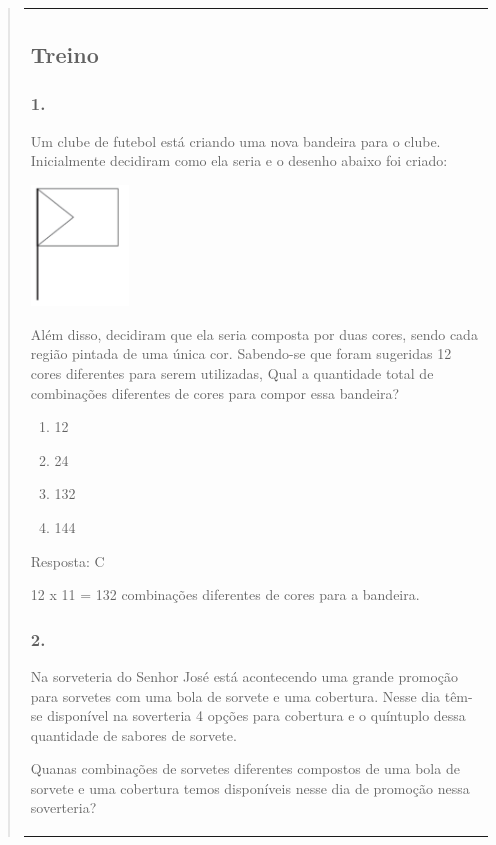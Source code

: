 \begin{enumerate}
\begin{escolha}
\begin{enumerate}
\begin{itemize}
\begin{itemize}
\begin{escolha}
\begin{quote}
\begin{escolha}
{\begin{longtable}[]{@{}l@{}}
\begin{itemize}
\subsection{Treino}\label{treino-10}

\subsubsection{1.}\label{section-140}

Um clube de futebol está criando uma nova bandeira para o clube.
Inicialmente decidiram como ela seria e o desenho abaixo foi criado:

\includegraphics[width=1.02511in,height=1.26282in]{media/image140.png}

Além disso, decidiram que ela seria composta por duas cores, sendo cada
região pintada de uma única cor. Sabendo-se que foram sugeridas 12 cores
diferentes para serem utilizadas, Qual a quantidade total de combinações
diferentes de cores para compor essa bandeira?

\begin{enumerate}
\def\labelenumi{\alph{enumi})}
\item
  12
\item
  24
\item
  132
\item
  144
\end{enumerate}

Resposta: C

12 x 11 = 132 combinações diferentes de cores para a bandeira.

\subsubsection{2.}\label{section-141}

Na sorveteria do Senhor José está acontecendo uma grande promoção para
sorvetes com uma bola de sorvete e uma cobertura. Nesse dia têm-se
disponível na soverteria 4 opções para cobertura e o quíntuplo dessa
quantidade de sabores de sorvete.

Quanas combinações de sorvetes diferentes compostos de uma bola de
sorvete e uma cobertura temos disponíveis nesse dia de promoção nessa
soverteria?


\end{itemize}
\end{longtable}}
\end{escolha}
\end{quote}
\end{escolha}
\end{itemize}
\end{itemize}
\end{enumerate}
\end{escolha}
\end{enumerate}
